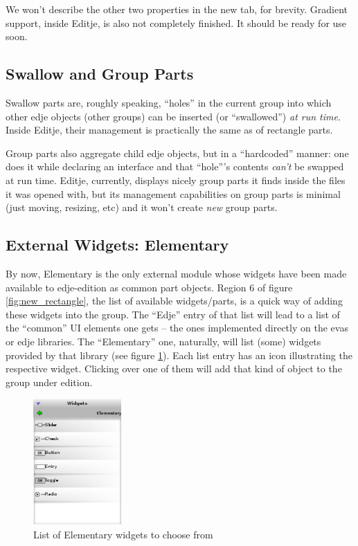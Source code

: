 \documentclass[a4paper]{profusion}
\begin{document}

We won't describe the other two properties in the new tab, for
brevity. Gradient support, inside Editje, is also not completely
finished. It should be ready for use soon.

\subsection{Swallow and Group Parts}

Swallow parts are, roughly speaking, ``holes'' in the current group
into which other edje objects (other groups) can be inserted (or
``swallowed'') \emph{at run time}. Inside Editje, their management is
practically the same as of rectangle parts.

Group parts also aggregate child edje objects, but in a ``hardcoded''
manner: one does it while declaring an interface and that ``hole'''s
contents \emph{can't} be swapped at run time. Editje, currently,
displays nicely group parts it finds inside the files it was opened
with, but its management capabilities on group parts is minimal (just
moving, resizing, etc) and it won't create \emph{new} group parts.

\subsection{External Widgets: Elementary}

By now, Elementary is the only external module whose widgets have been
made available to edje-edition as common part objects. Region 6 of
figure \ref{fig:new_rectangle}, the list of available widgets/parts,
is a quick way of adding these widgets into the group. The ``Edje''
entry of that list will lead to a list of the ``common'' UI elements
one gets -- the ones implemented directly on the evas or edje
libraries. The ``Elementary'' one, naturally, will list (some) widgets
provided by that library (see figure \ref{fig:elm_widgets}). Each list
entry has an icon illustrating the respective widget. Clicking over
one of them will add that kind of object to the group under edition.

\begin{figure}[h!]
  \centering
  \includegraphics[width=0.3\textwidth]{images/elm_widgets.png}
  \caption{List of Elementary widgets to choose from}
  \label{fig:elm_widgets}
\end{figure}
\end{document}
